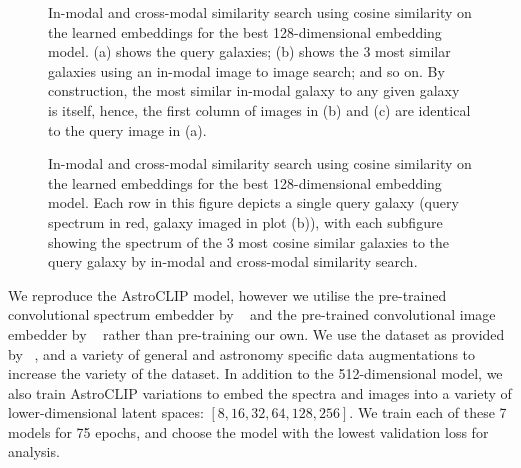 \documentclass[a4paper,11pt]{article}
\begin{document}
\begin{figure}[t]
    \centering
    \caption{In-modal and cross-modal similarity search using cosine similarity on the learned embeddings for the
        best 128-dimensional embedding model.
        (a) shows the query galaxies; (b) shows the 3 most similar galaxies using an in-modal image to image search; and
        so on.
        By construction, the most similar in-modal galaxy to any given galaxy is itself, hence, the first column of images
        in (b) and (c) are identical to the query image in (a).}
    \label{fig:ssia}
\end{figure}

\begin{figure}[t]
    \centering
    \caption{In-modal and cross-modal similarity search using cosine similarity on the learned embeddings for the
        best 128-dimensional embedding model.
        Each row in this figure depicts a single query galaxy (query spectrum in red, galaxy imaged in plot (b)), with
        each subfigure showing the spectrum of the 3 most cosine similar galaxies to the
        query galaxy by in-modal and cross-modal similarity search.}
    \label{fig:sss}
\end{figure}

We reproduce the AstroCLIP model, however we utilise the pre-trained convolutional spectrum embedder by ~\cite{liang2023}
and the pre-trained convolutional image embedder by ~\cite{stein2021} rather than pre-training our own.
We use the dataset as provided by ~\cite{astroclip}, and a variety of general and astronomy specific data augmentations
to increase the variety of the dataset.
In addition to the 512-dimensional model, we also train AstroCLIP variations to embed the spectra and images into
a variety of lower-dimensional latent spaces: $[8, 16, 32, 64, 128, 256]$.
We train each of these 7 models for 75 epochs, and choose the model with the lowest validation loss for analysis.
\end{document}
